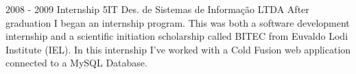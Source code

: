     {}
    {}
    {}
\cvevent
    {2008 - 2009}
    {Internship}
    {5IT Des. de Sistemas de Informação LTDA}
    {After graduation I began an internship program. This was both a software development internship and a scientific initiation scholarship called BITEC from Euvaldo Lodi Institute (IEL). In this internship I’ve worked with a Cold Fusion web application connected to a MySQL Database.}
    {}
    {}
    {}

